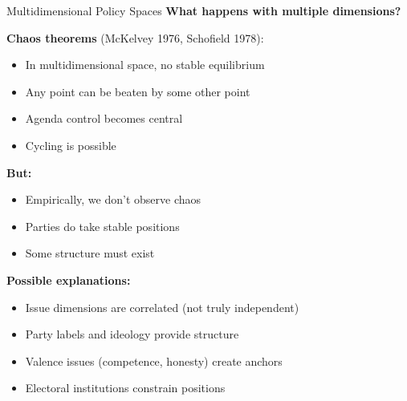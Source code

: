 \documentclass[10pt]{beamer}
\begin{document}
\begin{frame}[allowframebreaks]{Multidimensional Policy Spaces}
\textbf{What happens with multiple dimensions?}



\textbf{Chaos theorems} (McKelvey 1976, Schofield 1978):
\begin{itemize}
\item In multidimensional space, \alert{no stable equilibrium}
\item Any point can be beaten by some other point
\item Agenda control becomes central
\item Cycling is possible
\end{itemize}



\textbf{But:}
\begin{itemize}
\item Empirically, we don't observe chaos
\item Parties do take stable positions
\item Some structure must exist
\end{itemize}

  \framebreak  

\textbf{Possible explanations:}
\begin{itemize}
\item Issue dimensions are correlated (not truly independent)
\item Party labels and ideology provide structure
\item Valence issues (competence, honesty) create anchors
\item Electoral institutions constrain positions
\end{itemize}
\end{frame}
\end{document}
